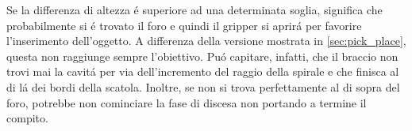 Se la differenza di altezza \'{e} superiore ad una determinata soglia, significa che probabilmente si \'{e} 
trovato il foro e quindi il gripper si aprir\'{a} per favorire l'inserimento dell'oggetto. 
A differenza della versione mostrata in \ref{sec:pick_place}, questa non raggiunge sempre l'obiettivo. 
Pu\'{o} capitare, infatti, che il braccio non trovi mai la cavit\'{a} per via dell'incremento del raggio della spirale e che finisca 
al di l\'{a} dei bordi della scatola. Inoltre, se non si trova perfettamente al di sopra del foro, potrebbe non cominciare la 
fase di discesa non portando a termine il compito.
